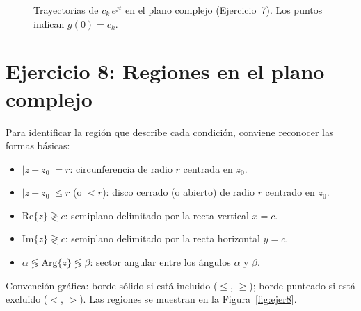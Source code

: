 \documentclass[10pt,a4paper]{article}
\begin{document}
\begin{figure}[H]
	\centering
	\begin{minipage}{\linewidth}
		\centering
		
		\caption{Trayectorias de $c_k\,e^{jt}$ en el plano complejo (Ejercicio~7). Los puntos indican $g(0)=c_k$.}
		\label{fig:ejer7_ck}
	\end{minipage}
\end{figure}

\section*{Ejercicio 8: Regiones en el plano complejo}

Para identificar la región que describe cada condición, conviene reconocer las formas básicas:
\begin{itemize}
	\item $|z - z_0| = r$: circunferencia de radio $r$ centrada en $z_0$.
	\item $|z - z_0| \leq r$ (o $< r$): disco cerrado (o abierto) de radio $r$ centrado en $z_0$.
	\item $\mathrm{Re}\{z\} \gtrless c$: semiplano delimitado por la recta vertical $x = c$.
	\item $\mathrm{Im}\{z\} \gtrless c$: semiplano delimitado por la recta horizontal $y = c$.
	\item $\alpha \lessgtr \mathrm{Arg}\{z\} \lessgtr \beta$: sector angular entre los ángulos $\alpha$ y $\beta$.
\end{itemize}
Convención gráfica: borde sólido si está incluido ($\leq$, $\geq$); borde punteado si está excluido ($<$, $>$). Las regiones se muestran en la Figura~\ref{fig:ejer8}.
\end{document}

